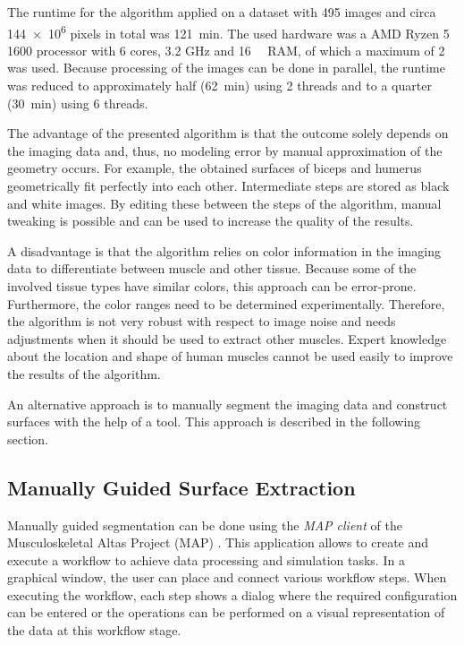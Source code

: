 The runtime for the algorithm applied on a dataset with \num{495} images and circa \num{144e6} pixels in total was \SI{121}{\minute}. The used hardware was a AMD Ryzen 5 1600 processor with 6 cores, 3.2 GHz and \SI{16}{\giga\byte} RAM, of which a maximum of \SI{2}{\giga\byte} was used. Because processing of the images can be done in parallel, the runtime was reduced to approximately half (\SI{62}{\minute}) using 2 threads and to a quarter (\SI{30}{\minute}) using 6 threads.

The advantage of the presented algorithm is that the outcome solely depends on the imaging data and, thus, no modeling error by manual approximation of the geometry occurs. For example, the obtained surfaces of biceps and humerus geometrically fit perfectly into each other. Intermediate steps are stored as black and white images. By editing these between the steps of the algorithm, manual tweaking is possible and can be used to increase the quality of the results.

A disadvantage is that the algorithm relies on color information in the imaging data to differentiate between muscle and other tissue. Because some of the involved tissue types have similar colors, this approach can be error-prone. Furthermore, the color ranges need to be determined experimentally. Therefore, the algorithm is not very robust with respect to image noise and needs adjustments when it should be used to extract other muscles. Expert knowledge about the location and shape of human muscles cannot be used easily to improve the results of the algorithm.

An alternative approach is to manually segment the imaging data and construct surfaces with the help of a tool. This approach is described in the following section.

\subsection{Manually Guided Surface Extraction}\label{sec:surf_extr}

Manually guided segmentation can be done using the \emph{MAP client} of the Musculoskeletal Altas Project (MAP) \cite{mapclient}. This application allows to create and execute a workflow to achieve data processing and simulation tasks. In a graphical window, the user can place and connect various workflow steps. When executing the workflow, each step shows a dialog where the required configuration can be entered or the operations can be performed on a visual representation of the data at this workflow stage. 


